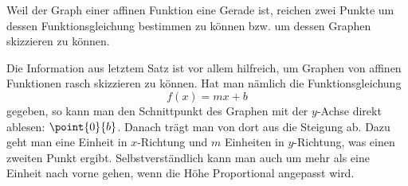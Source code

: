 \documentclass[%
11pt,%
twoside,%
titlepage,%
german,%
headsepline%
]{scrartcl}
\begin{document}
\begin{bem}
Weil der Graph einer affinen Funktion eine Gerade ist, reichen zwei Punkte um dessen Funktionsgleichung bestimmen zu k\"onnen bzw. um dessen Graphen skizzieren zu k\"onnen.
\end{bem}
\begin{bem}
Die Information aus letztem Satz ist vor allem hilfreich, um Graphen von affinen Funktionen rasch skizzieren zu k\"onnen. Hat man n\"amlich die Funktionsgleichung
$$f(x)=mx+b$$
gegeben, so kann man den Schnittpunkt des Graphen mit der $y$-Achse direkt ablesen: $\point{0}{b}$. Danach tr\"agt man von dort aus die Steigung ab. Dazu geht man eine Einheit in $x$-Richtung und $m$ Einheiten in $y$-Richtung, was einen zweiten Punkt ergibt. Selbstverst\"andlich kann man auch um mehr als eine Einheit \glqq nach vorne gehen\grqq, wenn die H\"ohe Proportional angepasst wird.
\end{bem}
\end{document}
